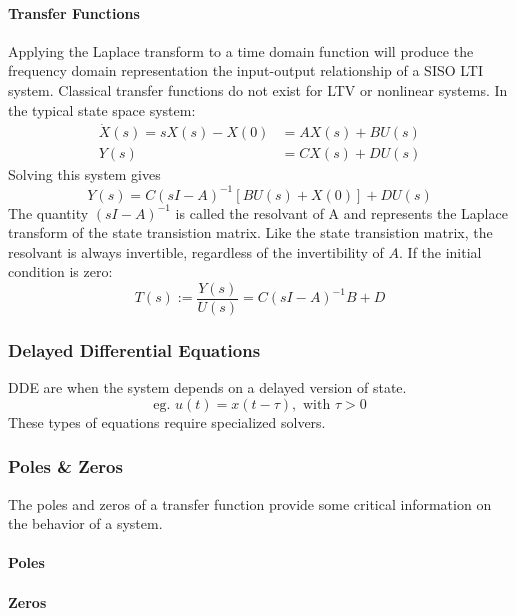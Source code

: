 \documentclass[../notes.tex]{subfiles}
\begin{document}
\paragraph{Transfer Functions} \label{sec:transfer_func}
Applying the Laplace transform to a time domain function will produce the frequency domain representation the input-output relationship of a SISO LTI system. Classical transfer functions do not exist for LTV or nonlinear systems. In the typical state space system:
\begin{align*}
    \dot{X}(s) = sX(s) - X(0) &= AX(s) + BU(s) \\
    Y(s) &= CX(s) + DU(s)
\end{align*}
Solving this system gives 
\begin{equation}
    Y(s) = C(sI-A)^{-1}[BU(s) + X(0)] + DU(s)
\end{equation}
The quantity $(sI-A)^{-1}$ is called the resolvant of A and represents the Laplace transform of the state transistion matrix. Like the state transistion matrix, the resolvant is always invertible, regardless of the invertibility of $A$. If the initial condition is zero:
\begin{equation}
    T(s) := \frac{Y(s)}{U(s)} = C(sI-A)^{-1}B+D
\end{equation}

\subsubsection{Delayed Differential Equations}
DDE are when the system depends on a delayed version of state.
\begin{equation}
    \text{eg. }u(t) = x(t-\tau), \text{ with } \tau > 0
\end{equation}
These types of equations require specialized solvers.

\subsubsection{Poles \& Zeros}
The poles and zeros of a transfer function provide some critical information on the behavior of a system.

\paragraph{Poles}

\paragraph{Zeros}
\end{document}
